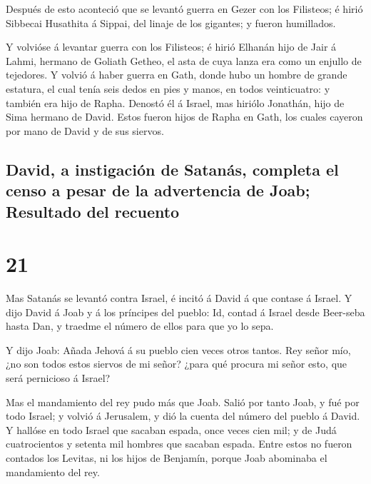  Después de esto aconteció que se levantó guerra en Gezer
con los Filisteos; é hirió Sibbecai Husathita á Sippai, del linaje de
los gigantes; y fueron humillados.

 Y volvióse á levantar guerra con los Filisteos; é hirió
Elhanán hijo de Jair á Lahmi, hermano de Goliath Getheo, el asta de cuya
lanza era como un enjullo de tejedores.  Y volvió á haber
guerra en Gath, donde hubo un hombre de grande estatura, el cual tenía
seis dedos en pies y manos, en todos veinticuatro: y también era hijo de
Rapha.  Denostó él á Israel, mas hiriólo Jonathán, hijo de
Sima hermano de David.  Estos fueron hijos de Rapha en
Gath, los cuales cayeron por mano de David y de sus siervos.

\hypertarget{david-a-instigaciuxf3n-de-satanuxe1s-completa-el-censo-a-pesar-de-la-advertencia-de-joab-resultado-del-recuento}{%
\subsection{David, a instigación de Satanás, completa el censo a pesar
de la advertencia de Joab; Resultado del
recuento}\label{david-a-instigaciuxf3n-de-satanuxe1s-completa-el-censo-a-pesar-de-la-advertencia-de-joab-resultado-del-recuento}}

\hypertarget{section-20}{%
\section{21}\label{section-20}}

 Mas Satanás se levantó contra Israel, é incitó á David á
que contase á Israel.  Y dijo David á Joab y á los
príncipes del pueblo: Id, contad á Israel desde Beer-seba hasta Dan, y
traedme el número de ellos para que yo lo sepa.

 Y dijo Joab: Añada Jehová á su pueblo cien veces otros
tantos. Rey señor mío, ¿no son todos estos siervos de mi señor? ¿para
qué procura mi señor esto, que será pernicioso á Israel?

 Mas el mandamiento del rey pudo más que Joab. Salió por
tanto Joab, y fué por todo Israel; y volvió á Jerusalem, y dió la cuenta
del número del pueblo á David.  Y hallóse en todo Israel
que sacaban espada, once veces cien mil; y de Judá cuatrocientos y
setenta mil hombres que sacaban espada.  Entre estos no
fueron contados los Levitas, ni los hijos de Benjamín, porque Joab
abominaba el mandamiento del rey.

